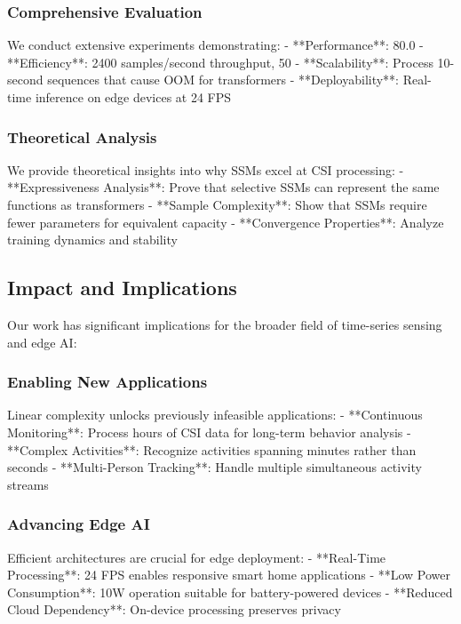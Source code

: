 \documentclass[10pt,journal,compsoc]{IEEEtran}
\begin{document}
\subsubsection{Comprehensive Evaluation}
We conduct extensive experiments demonstrating:
- **Performance**: 80.0%
- **Efficiency**: 2400 samples/second throughput, 50%
- **Scalability**: Process 10-second sequences that cause OOM for transformers
- **Deployability**: Real-time inference on edge devices at 24 FPS

\subsubsection{Theoretical Analysis}
We provide theoretical insights into why SSMs excel at CSI processing:
- **Expressiveness Analysis**: Prove that selective SSMs can represent the same functions as transformers
- **Sample Complexity**: Show that SSMs require fewer parameters for equivalent capacity
- **Convergence Properties**: Analyze training dynamics and stability

\subsection{Impact and Implications}

Our work has significant implications for the broader field of time-series sensing and edge AI:

\subsubsection{Enabling New Applications}
Linear complexity unlocks previously infeasible applications:
- **Continuous Monitoring**: Process hours of CSI data for long-term behavior analysis
- **Complex Activities**: Recognize activities spanning minutes rather than seconds
- **Multi-Person Tracking**: Handle multiple simultaneous activity streams

\subsubsection{Advancing Edge AI}
Efficient architectures are crucial for edge deployment:
- **Real-Time Processing**: 24 FPS enables responsive smart home applications
- **Low Power Consumption**: 10W operation suitable for battery-powered devices
- **Reduced Cloud Dependency**: On-device processing preserves privacy
\end{document}
